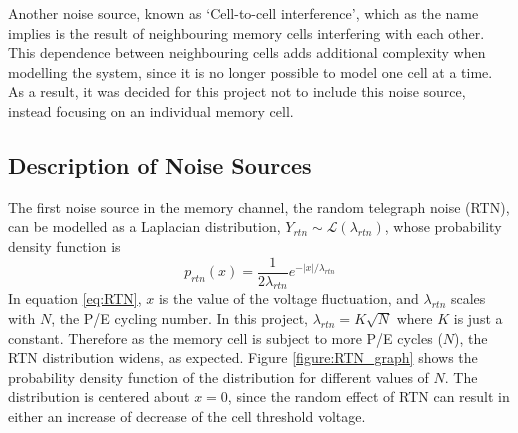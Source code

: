 \documentclass[11pt]{article}
\numberwithin{equation}{subsection}
\begin{document}
Another noise source, known as `Cell-to-cell interference', which as the name implies is the result of neighbouring memory cells interfering with each other. This dependence between neighbouring cells adds additional complexity when modelling the system, since it is no longer possible to model one cell at a time. As a result, it was decided for this project not to include this noise source, instead focusing on an individual memory cell.

\subsection{Description of Noise Sources}

The first noise source in the memory channel, the random telegraph noise (RTN), can be modelled as a Laplacian distribution, $Y_{rtn} \sim \mathcal{L}(\lambda_{rtn})$, whose probability density function is
\begin{equation} \label{eq:RTN}
p_{rtn}(x) = \dfrac{1}{2\lambda_{rtn}}e^{-\lvert x \rvert / \lambda_{rtn}}
\end{equation}
In equation \ref{eq:RTN}, $x$ is the value of the voltage fluctuation, and $\lambda_{rtn}$ scales with $N$, the P/E cycling number. In this project, $\lambda_{rtn} = K \sqrt{N}$ where $K$ is just a constant. Therefore as the memory cell is subject to more P/E cycles ($N$), the RTN distribution widens, as expected. Figure \ref{figure:RTN_graph} shows the probability density function of the distribution for different values of $N$. The distribution is centered about $x=0$, since the random effect of RTN can result in either an increase of decrease of the cell threshold voltage.
\end{document}

